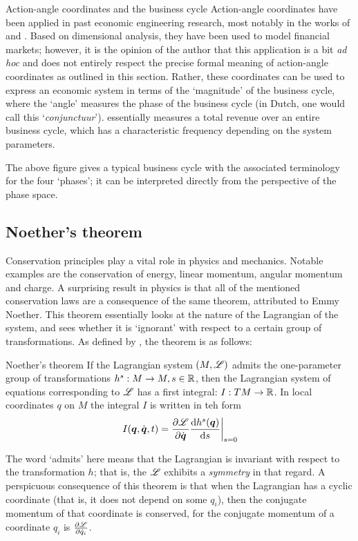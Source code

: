 \begin{econ}{Action-angle coordinates and the business cycle}
    Action-angle coordinates have been applied in past economic engineering research, most notably in the works of \citet{VanArdenne2020} and \citet{Vos2019}. Based on dimensional analysis, they have been used to model financial markets; however, it is the opinion of the author that this application is a bit \emph{ad hoc} and does not entirely respect the precise formal meaning of action-angle coordinates as outlined in this section. Rather, these coordinates can be used to express an economic system in terms of the `magnitude' of the business cycle, where the `angle' measures the phase of the business cycle (in Dutch, one would call this `\emph{conjunctuur}').  essentially measures a total revenue over an entire business cycle, which has a characteristic frequency depending on the system parameters.
    \begin{center}
        
    \end{center}
    The above figure gives a typical business cycle with the associated terminology for the four `phases'; it can be interpreted directly from the perspective of the phase space. 
\end{econ}

\subsection{Noether's theorem}
Conservation principles play a vital role in physics and mechanics. Notable examples are the conservation of energy, linear momentum, angular momentum and charge. A surprising result in physics is that all of the mentioned conservation laws are a consequence of the same theorem, attributed to Emmy Noether. This theorem essentially looks at the nature of the Lagrangian of the system, and sees whether it is `ignorant' with respect to a certain group of transformations. As defined by \citet{Arnold1989}, the theorem is as follows:

\begin{thmblock}{Noether's theorem}
    If the Lagrangian system $(M, \mathscr{L})$ admits the one-parameter group of transformations $h^s: M \to M, s \in \mathbb{R}$, then the Lagrangian system of equations corresponding to $\mathscr{L}$ has a first integral: $I: TM \to \mathbb{R}$. In local coordinates $q$ on $M$ the integral $I$ is written in teh form 
    $$ \left. I(\vb*{q}, \dot{\vb*{q}}, t) = \pdv{\ensuremath{\mathscr{L}}}{\ensuremath{\dot{\vb*{q}}}}\dv{h^s(\ensuremath{\vb*{q}})}{s}\right |_{s = 0} $$
\end{thmblock}
The word `admits' here means that the Lagrangian is invariant with respect to the transformation $h$; that is, the $\mathscr{L}$ exhibits a \emph{symmetry} in that regard. A perspicuous consequence of this theorem is that when the Lagrangian has a cyclic coordinate (that is, it does not depend on some $q_i$), then the conjugate momentum of that coordinate is conserved, for the conjugate momentum of a coordinate $q_i$ is $\pdv{\ensuremath{\mathscr{L}}}{\dot{q}_i}$.

